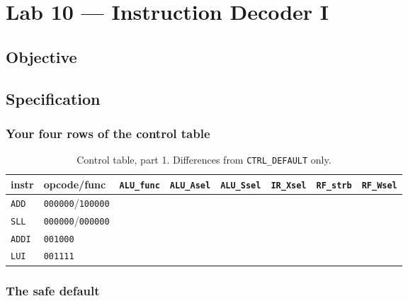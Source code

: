 
\chapter{Lab 10 --- Instruction Decoder I}

\section{Objective}

\section{Specification}

\subsection*{Your four rows of the control table}

\begin{table}[htbp]
\centering
\caption{Control table, part 1. Differences from \texttt{CTRL\_DEFAULT} only.}
\label{tab:lab10-ctrl}
\small
\begin{tabular}{llllllll}
\toprule
instr & opcode/func & \texttt{ALU\_func} & \texttt{ALU\_Asel} & \texttt{ALU\_Ssel} & \texttt{IR\_Xsel} & \texttt{RF\_strb} & \texttt{RF\_Wsel} \\
\midrule
\texttt{ADD}  & \texttt{000000}/\texttt{100000} & & & & & & \\
\texttt{SLL}  & \texttt{000000}/\texttt{000000} & & & & & & \\
\texttt{ADDI} & \texttt{001000} & & & & & & \\
\texttt{LUI}  & \texttt{001111} & & & & & & \\
\bottomrule
\end{tabular}
\end{table}

\subsection*{The safe default}

